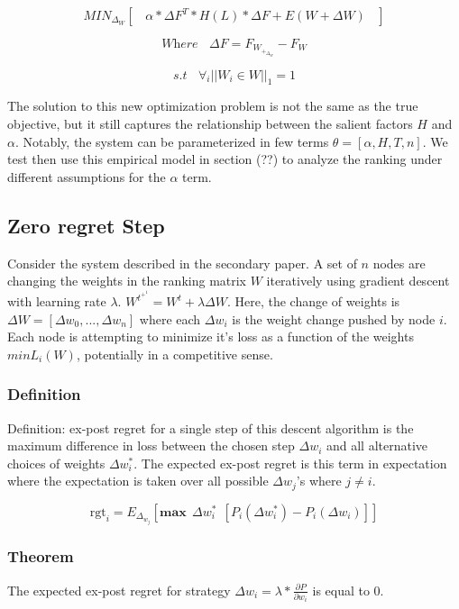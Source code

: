 \documentclass{article}
\begin{document}
\[ \textit{MIN}_\Delta_W [ \ \ \ \ \alpha * \Delta F^T * H(L) * \Delta F  + E(W + \Delta W) \ \ \ \ ] \]

\[ \textit{Where} \ \ \ \ \Delta F = F_W_+_\Delta_W - F_W \]

\[ \textit{s.t} \ \ \ \  \forall_i || W_i \in W ||_1 = 1\]

The solution to this new optimization problem is not the same as the true objective, but it still captures the relationship between the salient factors $H$ and $\alpha$. Notably, the system can be parameterized in few terms $\theta = [\alpha, H, T, n]$. We test then use this empirical model in section (??) to analyze the ranking under different assumptions for the $\alpha$ term. 

\subsection{Zero regret Step}
 
Consider the system described in the secondary paper. A set of $n$ nodes are changing the weights in the ranking matrix $W$ iteratively using gradient descent with learning rate $\lambda$. $W^t^+^1 = W^t + \lambda \Delta W$. Here, the change of weights is $\Delta W = [\Delta w_0, ... , \Delta w_n]$ where each $\Delta w_i$ is the weight change pushed by node $i$. Each node is attempting to minimize it's loss as a function of the weights  $min L_i(W)$, potentially in a competitive sense.

\subsubsection{Definition}

Definition: ex-post regret for a single step of this descent algorithm is the maximum difference in loss between the chosen step $\Delta w_i$ and all alternative choices of weights $\Delta w_i^*$. The expected ex-post regret is this term in expectation where the expectation is taken over all possible $\Delta w_j$'s where $j \neq i$.

\[ \textrm{rgt}_i = E_\Delta_w_j [ \textbf{max} \ \ \Delta w_i^* \ \ [P_i(\Delta w_i^*) - P_i(\Delta w_i)] ] \]

\subsubsection{Theorem}

The expected ex-post regret for strategy $\Delta w_i = \lambda * \frac{\partial P}{\partial w_i}$ is equal to 0.
\end{document}
